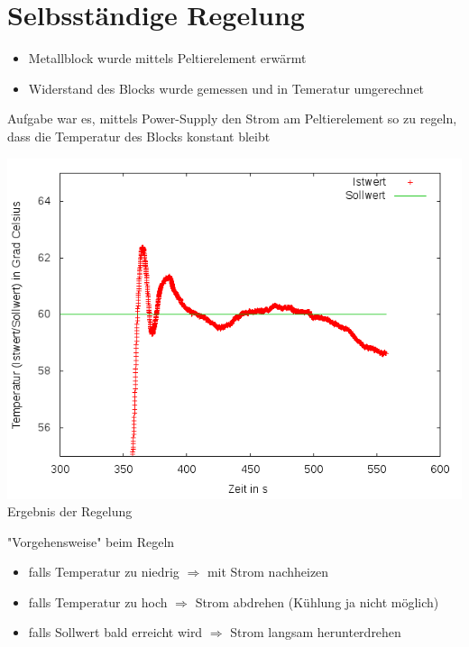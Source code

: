 \documentclass[compress,11pt]{beamer}
\begin{document}
\section{Selbsständige Regelung}
\begin{frame}


\begin{itemize}
\item Metallblock wurde mittels Peltierelement erwärmt
\item Widerstand des Blocks wurde gemessen und in Temeratur umgerechnet
\end{itemize}
Aufgabe war es, mittels Power-Supply den Strom am Peltierelement so zu regeln, dass die Temperatur des Blocks konstant bleibt
\end{frame}
\begin{frame}
\textsc{\includegraphics[width=.7\textwidth]{../2aufgabe/2a_T_genauer}\\}
Ergebnis der Regelung
\end{frame}
\begin{frame}
\begin{block}{"Vorgehensweise" beim Regeln}
\begin{itemize}
\item falls Temperatur zu niedrig $\Rightarrow$ mit Strom nachheizen
\item falls Temperatur zu hoch $\Rightarrow$ Strom abdrehen (Kühlung ja nicht möglich)
\item falls Sollwert bald erreicht wird $\Rightarrow$ Strom langsam herunterdrehen
\end{itemize}
\end{block}
\end{frame}
\end{document}
